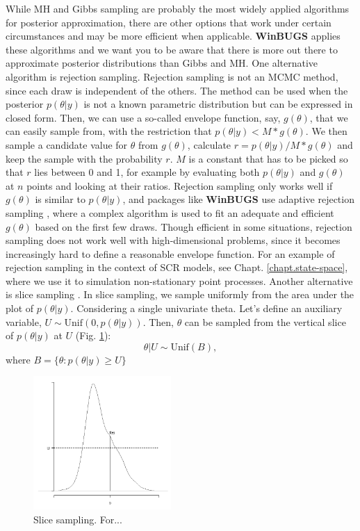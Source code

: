 While MH and Gibbs sampling are probably the most widely applied
algorithms for posterior approximation, there are other options that
work under certain circumstances and may be more efficient when
applicable. {\bf WinBUGS} applies these algorithms and we want you to be
aware that there is more out there to approximate posterior
distributions than Gibbs and MH.  One alternative algorithm is
rejection sampling. Rejection sampling is not an MCMC method, since
each draw is independent of the others. The method can be used when
the posterior $p(\theta|y)$ is not a known parametric distribution but
can be expressed in closed form. Then, we can use a so-called envelope
function, say, $g(\theta)$, that we can easily sample from, with the
restriction that $p(\theta|y) < M * g(\theta)$. We then sample a
candidate value for $\theta$ from $g(\theta)$, calculate $r =
p(\theta|y)/M*g(\theta)$ and keep the sample with the probability
$r$. $M$ is a constant that has to be picked so that $r$ lies between
0 and 1, for example by evaluating both $p(\theta|y)$ and $g(\theta)$
at $n$ points and looking at their ratios. Rejection sampling only
works well if $g(\theta)$ is similar to $p(\theta|y)$, and packages
like {\bf WinBUGS} use adaptive rejection sampling \citep{gilks_wild:1992},
where a complex algorithm is used to fit an adequate and efficient
$g(\theta)$ based on the first few draws. 
Though efficient in some
situations, rejection sampling does not work well with
high-dimensional problems, since it becomes increasingly hard to
define a reasonable envelope function. For an example of rejection
sampling in the context of SCR models, see
Chapt. \ref{chapt.state-space}, where we use it to simulation
non-stationary point processes.  Another alternative is slice sampling
\citep{neal:2003}. In slice sampling, we sample uniformly from the
area under the plot of $p(\theta|y)$. Considering a single univariate
theta. Let's define an auxiliary variable, $U \sim \mbox{Unif}(0,
p(\theta|y))$. Then, $\theta$ can be sampled from the vertical slice
of $p(\theta|y)$ at $U$ (Fig. \ref{mcmc.fig.slicesample}):
\[
\theta|U \sim \mbox{Unif}(B),
\]
where $B = \{\theta: p(\theta|y) \geq U\}$

\begin{figure}
\begin{center}
\includegraphics[height=2in]{Ch7/figs/slicesampling}
\end{center}
\caption{Slice sampling. For...}
\label{mcmc.fig.slicesample}
\end{figure}

